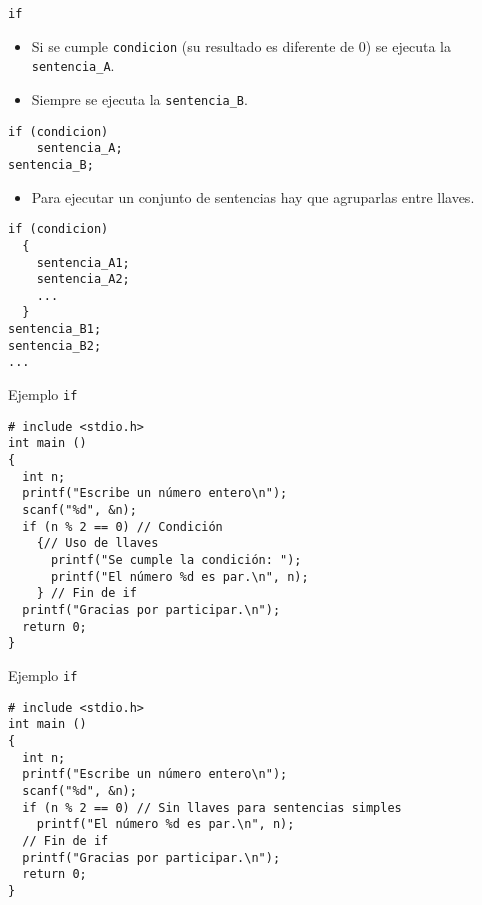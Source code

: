 \documentclass[xcolor={usenames,svgnames,dvipsnames}, aspectratio=169]{beamer}
\begin{document}
\begin{frame}[label={sec:org9ceff6c},fragile]{\texttt{if}}
 \begin{itemize}
\item Si se cumple \texttt{condicion} (su resultado es \alert{diferente de 0}) se ejecuta la \texttt{sentencia\_A}.
\item \alert{Siempre} se ejecuta la \texttt{sentencia\_B}.
\end{itemize}
\lstset{language=C,label= ,caption= ,captionpos=b,numbers=none}
\begin{lstlisting}
if (condicion)
    sentencia_A;
sentencia_B;
\end{lstlisting}
\begin{itemize}
\item Para ejecutar un conjunto de sentencias hay que agruparlas \alert{entre llaves}.
\end{itemize}
\lstset{language=C,label= ,caption= ,captionpos=b,numbers=none}
\begin{lstlisting}
if (condicion)
  {
    sentencia_A1;
    sentencia_A2;
    ...
  }
sentencia_B1;
sentencia_B2;
...
\end{lstlisting}
\end{frame}

\begin{frame}[label={sec:orga6502db},fragile]{Ejemplo \texttt{if}}
 \lstset{language=C,label= ,caption= ,captionpos=b,numbers=none}
\begin{lstlisting}
# include <stdio.h>
int main ()
{
  int n;
  printf("Escribe un número entero\n");
  scanf("%d", &n);
  if (n % 2 == 0) // Condición
    {// Uso de llaves
      printf("Se cumple la condición: ");
      printf("El número %d es par.\n", n);      
    } // Fin de if
  printf("Gracias por participar.\n");
  return 0;
}
\end{lstlisting}
\end{frame}

\begin{frame}[label={sec:orgb610e4f},fragile]{Ejemplo \texttt{if}}
 \lstset{language=C,label= ,caption= ,captionpos=b,numbers=none}
\begin{lstlisting}
# include <stdio.h>
int main ()
{
  int n;
  printf("Escribe un número entero\n");
  scanf("%d", &n);
  if (n % 2 == 0) // Sin llaves para sentencias simples
    printf("El número %d es par.\n", n);
  // Fin de if
  printf("Gracias por participar.\n");
  return 0;
}
\end{lstlisting}
\end{frame}
\end{document}
